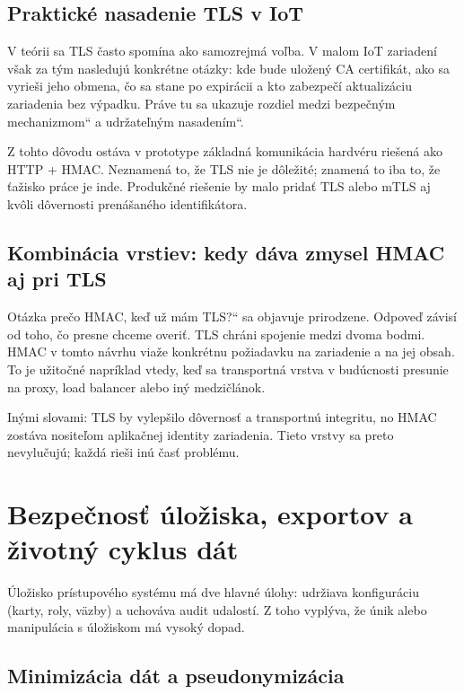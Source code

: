 \documentclass[journal,a4paper,onecolumn]{IEEEtran}
\newcommand{\uv}[1]{\quotedblbase#1\textquotedblleft}
\begin{document}
\subsection{Praktické nasadenie TLS v IoT}

V teórii sa TLS často spomína ako samozrejmá voľba. V malom IoT zariadení však za tým nasledujú konkrétne otázky: kde bude uložený CA certifikát, ako sa vyrieši jeho obmena, čo sa stane po expirácii a kto zabezpečí aktualizáciu zariadenia bez výpadku. Práve tu sa ukazuje rozdiel medzi \uv{bezpečným mechanizmom} a \uv{udržateľným nasadením}.

Z tohto dôvodu ostáva v prototype základná komunikácia hardvéru riešená ako HTTP + HMAC. Neznamená to, že TLS nie je dôležité; znamená to iba to, že ťažisko práce je inde. Produkčné riešenie by malo pridať TLS alebo mTLS aj kvôli dôvernosti prenášaného identifikátora.

\subsection{Kombinácia vrstiev: kedy dáva zmysel HMAC aj pri TLS}

Otázka \uv{prečo HMAC, keď už mám TLS?} sa objavuje prirodzene. Odpoveď závisí od toho, čo presne chceme overiť. TLS chráni spojenie medzi dvoma bodmi. HMAC v tomto návrhu viaže konkrétnu požiadavku na zariadenie a na jej obsah. To je užitočné napríklad vtedy, keď sa transportná vrstva v budúcnosti presunie na proxy, load balancer alebo iný medzičlánok.

Inými slovami: TLS by vylepšilo dôvernosť a transportnú integritu, no HMAC zostáva nositeľom aplikačnej identity zariadenia. Tieto vrstvy sa preto nevylučujú; každá rieši inú časť problému.


\section{Bezpečnosť úložiska, exportov a životný cyklus dát}

Úložisko prístupového systému má dve hlavné úlohy: udržiava konfiguráciu (karty, roly, väzby) a uchováva audit udalostí. Z toho vyplýva, že únik alebo manipulácia s úložiskom má vysoký dopad.

\subsection{Minimizácia dát a pseudonymizácia}
\end{document}
